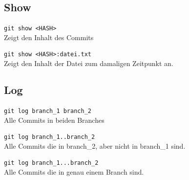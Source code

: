 \documentclass[oneside]{scrreprt}
\begin{document}
\subsection*{Show}
\verb+git show <HASH>+\\
Zeigt den Inhalt des Commits

\verb+git show <HASH>:datei.txt+\\
Zeigt den Inhalt der Datei zum damaligen Zeitpunkt an.

\subsection*{Log}
\verb+git log branch_1 branch_2+\\
Alle Commits in beiden Branches

\verb+git log branch_1..branch_2+\\
Alle Commits die in branch\_2, aber nicht in branch\_1 sind.

\verb+git log branch_1...branch_2+\\
Alle Commits die in genau einem Branch sind.
\end{document}
